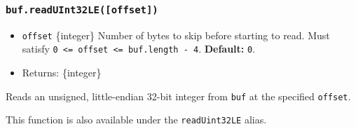 \subsubsection{\texorpdfstring{\texttt{buf.readUInt32LE({[}offset{]})}}{buf.readUInt32LE({[}offset{]})}}\label{buf.readuint32leoffset}

\begin{itemize}
\tightlist
\item
  \texttt{offset} \{integer\} Number of bytes to skip before starting to
  read. Must satisfy
  \texttt{0\ \textless{}=\ offset\ \textless{}=\ buf.length\ -\ 4}.
  \textbf{Default:} \texttt{0}.
\item
  Returns: \{integer\}
\end{itemize}

Reads an unsigned, little-endian 32-bit integer from \texttt{buf} at the
specified \texttt{offset}.

This function is also available under the \texttt{readUint32LE} alias.

\begin{Shaded}
\begin{Highlighting}[]
\NormalTok{ \{ }\NormalTok{ \} } \OperatorTok{;}

\OperatorTok{=} \NormalTok{([}\OperatorTok{,} \OperatorTok{,} \OperatorTok{,} \NormalTok{])}\OperatorTok{;}

\NormalTok{(}\NormalTok{)}\NormalTok{(}\NormalTok{))}\OperatorTok{;}
\NormalTok{(}\NormalTok{)}\NormalTok{(}\NormalTok{))}\OperatorTok{;}
\end{Highlighting}
\end{Shaded}


